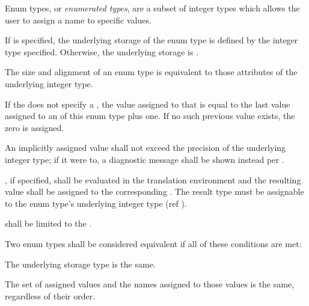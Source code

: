 \specsubsubitem
Enum types, or \textit{enumerated types}, are a subset of integer types which
allows the user to assign a name to specific values.

\specsubsubitem
If  is specified, the underlying storage of the enum
type is defined by the integer type specified. Otherwise, the underlying storage
is .

\specsubsubitem
The size and alignment of an enum type is equivalent to those attributes of the
underlying integer type.

\specsubsubitem
If the  does not specify a
, the value assigned to that 
is equal to the last value assigned to an  of this enum
type plus one. If no such previous value exists, the zero is assigned.

\specsubsubitem
An implicitly assigned value shall not exceed the precision of the underlying
integer type; if it were to, a diagnostic message shall be shown instead per
.

\specsubsubitem
{}, if specified, shall be evaluated in the
translation environment and the resulting value shall be assigned to the
corresponding . The result type must be assignable to
the enum type's underlying integer type (ref ).

\specsubsubitem
{} shall be limited to the
.

\specsubsubitem
Two enum types shall be considered equivalent if all of these conditions are
met:

\begin{subsubitemize}
\item
The underlying storage type is the same.
\item
The set of assigned values and the names assigned to those values is the same,
regardless of their order.
\end{subsubitemize}



\begin{grammar}
 \\
	\terminal{*}  \\
	 \terminal{*}  \\
\end{grammar}

